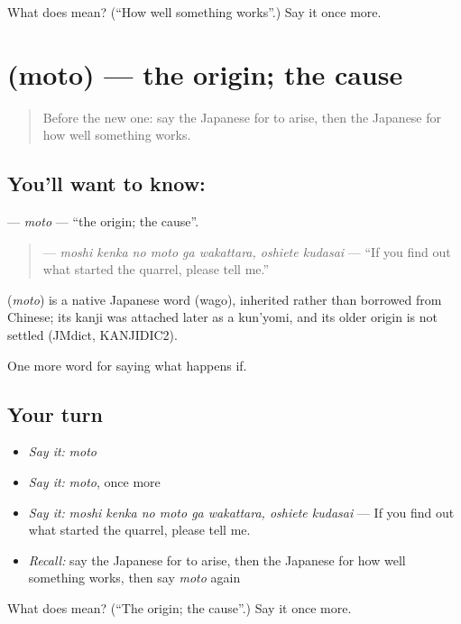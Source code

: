 \begin{tcolorbox}[breakable,colback=teal!4,colframe=teal!35!black,title={Before you move on}]
What does  mean? (\textquotedblleft{}How well something works\textquotedblright{}.) Say it once more.
\end{tcolorbox}
\section[\texorpdfstring{\ja{もと} (moto)}{もと (moto)}]{ (moto) — the origin; the cause}

\label{lesson:JA-C511-moto}



\begin{quote}
Before the new one: say the Japanese for to arise, then the Japanese for how well something works.
\end{quote}

\subsection*{You'll want to know: }
\textbf{} — \emph{moto} — \textquotedblleft{}the origin; the cause\textquotedblright{}.

\begin{quote}
\textbf{    } — \emph{moshi kenka no moto ga wakattara, oshiete kudasai} — \textquotedblleft{}If you find out what started the quarrel, please tell me.\textquotedblright{}
\end{quote}

\begin{cousinweb}
\textbf{} (\emph{moto}) is a native Japanese word (wago), inherited rather than borrowed from Chinese; its kanji was attached later as a kun'yomi, and its older origin is not settled (JMdict, KANJIDIC2).
\end{cousinweb}

\begin{grammarlens}[title={What you've built}]
One more word for saying what happens if.
\end{grammarlens}

\subsection*{Your turn}
\begin{itemize}
\raggedright
  \item \emph{Say it:} \emph{moto}
  \item \emph{Say it:} \emph{moto}, once more
  \item \emph{Say it:} \emph{moshi kenka no moto ga wakattara, oshiete kudasai} — If you find out what started the quarrel, please tell me.
  \item \emph{Recall:} say the Japanese for to arise, then the Japanese for how well something works, then say \emph{moto} again
\end{itemize}

\begin{tcolorbox}[breakable,colback=teal!4,colframe=teal!35!black,title={Before you move on}]
What does  mean? (\textquotedblleft{}The origin; the cause\textquotedblright{}.) Say it once more.
\end{tcolorbox}
